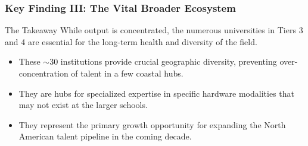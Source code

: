 \documentclass[aspectratio=169]{beamer}
\begin{document}
\begin{frame}
    \frametitle{Key Finding III: The Vital Broader Ecosystem}
    
    \begin{alertblock}{The Takeaway}
        While output is concentrated, the numerous universities in Tiers 3 and 4 are essential for the long-term health and diversity of the field.
    \end{alertblock}
    
    \begin{itemize}
        \item These $\sim$30 institutions provide crucial geographic diversity, preventing over-concentration of talent in a few coastal hubs.
        \item They are hubs for specialized expertise in specific hardware modalities that may not exist at the larger schools.
        \item They represent the primary growth opportunity for expanding the North American talent pipeline in the coming decade.
    \end{itemize}
\end{frame}
\end{document}
